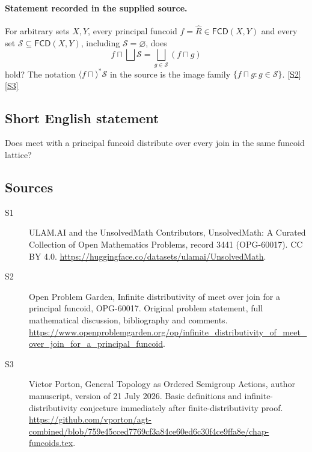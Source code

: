 \documentclass[11pt]{article}
\newcommand{\sref}[2]{\hyperlink{source:#1:#2}{[S#2]}}
\begin{document}
\paragraph{Statement recorded in the supplied source.}
For arbitrary sets $X,Y$, every principal funcoid $f=\widehat R\in\mathsf{FCD}(X,Y)$ and every set $\mathcal S\subseteq\mathsf{FCD}(X,Y)$, including $\mathcal S=\varnothing$, does
\[
 f\sqcap\bigsqcup\mathcal S
 =\bigsqcup_{g\in\mathcal S}(f\sqcap g)
\]
hold? The notation $\langle f\sqcap\rangle^*\mathcal S$ in the source is the image family $\{f\sqcap g:g\in\mathcal S\}$. \sref{3441}{2}\sref{3441}{3}
\subsection{Short English statement}
Does meet with a principal funcoid distribute over every join in the same funcoid lattice?
\subsection{Sources}
\begin{description}
\item[\hypertarget{source:3441:1}{S1}] ULAM.AI and the UnsolvedMath Contributors, UnsolvedMath: A Curated Collection of Open Mathematics Problems, record 3441 (OPG-60017). CC BY 4.0. \url{https://huggingface.co/datasets/ulamai/UnsolvedMath}.
\item[\hypertarget{source:3441:2}{S2}] Open Problem Garden, Infinite distributivity of meet over join for a principal funcoid, OPG-60017. Original problem statement, full mathematical discussion, bibliography and comments. \url{https://www.openproblemgarden.org/op/infinite_distributivity_of_meet_over_join_for_a_principal_funcoid}.
\item[\hypertarget{source:3441:3}{S3}] Victor Porton, General Topology as Ordered Semigroup Actions, author manuscript, version of 21 July 2026. Basic definitions and infinite-distributivity conjecture immediately after finite-distributivity proof. \url{https://github.com/vporton/agt-combined/blob/759e45cced7769cf3a84ce60ed6c30f4ce9ffa8e/chap-funcoids.tex}.
\end{description}
\label{end:3441}
\end{document}
